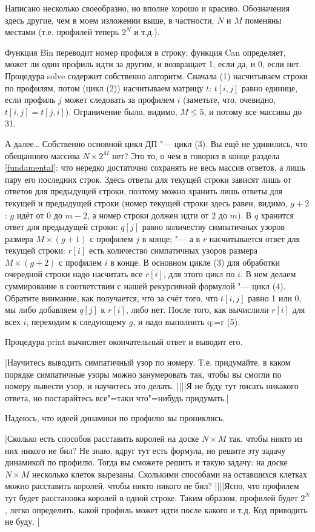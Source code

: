Написано несколько своеобразно, но вполне хорошо и красиво. Обозначения здесь другие, чем в моем изложении выше,
в частности, $N$ и $M$ поменяны местами (т.е. профилей теперь $2^N$ и т.д.).

Функция Bin переводит номер профиля в строку; функция Can
определяет, может ли один профиль идти за другим, и возвращает 1, если да, и 0, если нет. Процедура solve содержит 
собственно алгоритм. Сначала (1) насчитываем строки по профилям, потом (цикл (2)) насчитываем матрицу $t$:
$t[i,j]$ равно единице, если профиль $j$ может следовать за профилем $i$ (заметьте, что, очевидно, $t[i,j]=t[j,i]$).
Ограничение было, видимо, $M\leq 5$, и потому все массивы до 31.

А далее\dots{} Собственно основной цикл ДП "--- цикл (3). Вы ещё не удивились, что обещанного
массива $N\times 2^M$ нет? Это то, о чем я говорил в конце раздела
\ref{fundamental}: что нередко достаточно сохранять не весь массив ответов, а лишь пару его последних строк. Здесь 
ответы для текущей строки зависят лишь от ответов для предыдущей строки, поэтому можно хранить лишь
ответы для текущей и предыдущей строки (номер текущей строки здесь равен, видимо, $g+2$: $g$ идёт от
0 до $m-2$, а номер строки должен идти от $2$ до $m$). В $q$ хранится ответ для предыдущей строки: $q[j]$ равно
количеству симпатичных узоров размера $M\times (g+1)$ с профилем $j$ в конце; "--- а в $r$ насчитывается ответ для текущей строки:
$r[i]$ есть количество симпатичных узоров размера $M\times (g+2)$ с профилем $i$ в конце.
В основном цикле (3) для обработки очередной строки надо насчитать все $r[i]$, для этого цикл по $i$. В нем
делаем суммирование в соответствии с нашей рекурсивной формулой "--- цикл (4). Обратите внимание,
как получается, что за счёт того, что $t[i,j]$ равно 1 или 0, мы либо добавляем $q[j]$ к $r[i]$,
либо нет. После того, как вычислили $r[i]$ для всех $i$, переходим к следующему $g$, и надо выполнить q:=r (5).

Процедура print вычисляет окончательный ответ и выводит его.

\task|Научитесь выводить симпатичный узор по номеру. Т.е. придумайте, в каком порядке симпатичные узоры можно занумеровать так,
чтобы вы смогли по номеру вывести узор, и научитесь это делать.
||||Я не буду тут писать никакого ответа, но постарайтесь все"=таки что"=нибудь придумать.|

Надеюсь, что идеей динамики по профилю вы прониклись.

\task|Сколько есть способов расставить королей на доске $N\times M$ так, чтобы никто из них никого не бил?
Не знаю, вдруг тут есть формула, но решите эту задачу динамикой по профилю. Тогда вы сможете решить и такую задачу:
на доске $N\times M$ несколько клеток вырезаны. Сколькими способами на оставшихся клетках можно расставить королей, чтобы
никто никого не бил?
||||Ясно, что профилем тут будет расстановка королей в одной строке. Таким образом, профилей будет $2^N$, легко определить, какой профиль может идти после какого и т.д. Код приводить не буду.
|

